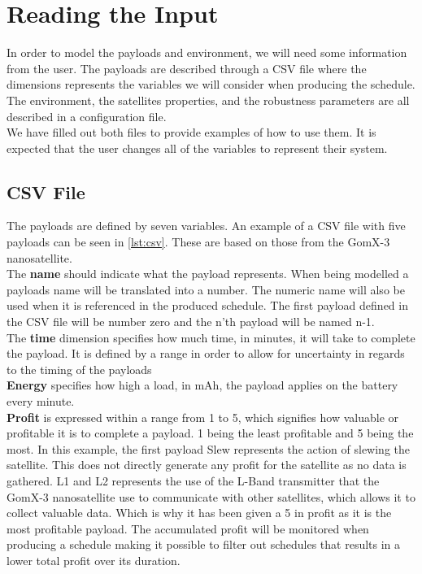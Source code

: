 \section{Reading the Input} \label{sec:read_input}
In order to model the payloads and environment, we will need some information from the user. The payloads are described through a CSV file where the dimensions represents the variables we will consider when producing the schedule. The environment, the satellites properties, and the robustness parameters are all described in a configuration file.\\
We have filled out both files to provide examples of how to use them. It is expected that the user changes all of the variables to represent their system.

\subsection{CSV File} \label{subsec:csv}
The payloads are defined by seven variables. An example of a CSV file with five payloads can be seen in \cref{lst:csv}. These are based on those from the GomX-3 nanosatellite\cite{gomx3}.\\
The \textbf{name} should indicate what the payload represents. When being modelled a payloads name will be translated into a number. The numeric name will also be used when it is referenced in the produced schedule. The first payload defined in the CSV file will be number zero and the n'th payload will be named n-1.\\
The \textbf{time} dimension specifies how much time, in minutes, it will take to complete the payload. It is defined by a range in order to allow for uncertainty in regards to the timing of the payloads\\
\textbf{Energy} specifies how high a load, in mAh, the payload applies on the battery every minute.\\
\textbf{Profit} is expressed within a range from 1 to 5, which signifies how valuable or profitable it is to complete a payload.
1 being the least profitable and 5 being the most.
In this example, the first payload Slew represents the action of slewing the satellite. This does not directly generate any profit for the satellite as no data is gathered. L1 and L2 represents the use of the L-Band transmitter that the GomX-3 nanosatellite use to communicate with other satellites, which allows it to collect valuable data. Which is why it has been given a 5 in profit as it is the most profitable payload. The accumulated profit will be monitored when producing a schedule making it possible to filter out schedules that results in a lower total profit over its duration.\\
